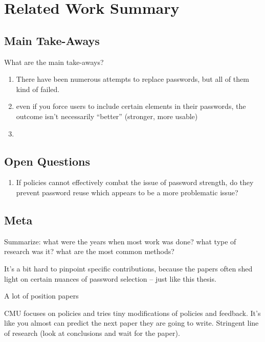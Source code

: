 
\chapter[Related Work Summary]{Related Work Summary}\label{chap:rw:summary}


\section{Main Take-Aways}
What are the main take-aways?

\begin{enumerate}
	\item There have been numerous attempts to replace passwords, but all of them kind of failed.
	\item even if you force users to include certain elements in their passwords, the outcome isn't necessarily ``better'' (stronger, more usable)
	\item 
	
\end{enumerate}

\section{Open Questions}
\begin{enumerate}
\item If policies cannot effectively combat the issue of password strength, do they prevent password reuse which appears to be a more problematic issue? 
\end{enumerate}

\section{Meta}

Summarize: what were the years when most work was done? what type of research was it? what are the most common methods?

It's a bit hard to pinpoint specific contributions, because the papers often shed light on certain nuances of password selection -- just like this thesis.

A lot of position papers

CMU focuses on policies and tries tiny modifications of policies and feedback. It's like you almost can predict the next paper they are going to write. Stringent line of research (look at conclusions and wait for the paper).



